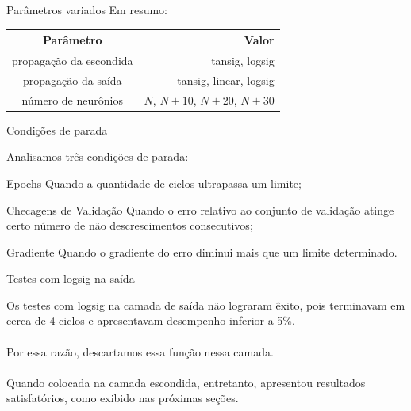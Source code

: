 \begin{frame}{Parâmetros variados}
	Em resumo:
	\begin{table}[H] 
		\centering 
		\begin{tabular}{c|r} 
			Parâmetro & Valor \\ 
			\hline 
			propagação da escondida 	& tansig, logsig\\
			propagação da saída 	        & tansig, linear, logsig\\
			número de neurônios		& $N$, $N+10$, $N+20$, $N+30$\\
		\end{tabular} 
	\end{table}
\end{frame}

\begin{frame}{Condições de parada}
	
Analisamos três condições de parada:

	\begin{block}{Epochs}
        Quando a quantidade de ciclos ultrapassa
                um limite;
	\end{block}

	\begin{block}{Checagens de Validação}
        	Quando o erro relativo ao conjunto
                de validação atinge certo número de não descrescimentos consecutivos;
	\end{block}
	
	\begin{block}{Gradiente}
		Quando o gradiente do erro diminui mais que
                um limite determinado.
	\end{block}

\end{frame}

\begin{frame}{Testes com logsig na saída}
	
	Os testes com logsig na camada de saída não lograram êxito, 
	pois terminavam em cerca de 4 ciclos e apresentavam desempenho
	inferior a 5\%.\\~\\

	Por essa razão, descartamos essa função nessa camada. \\~\\

	Quando colocada na camada escondida, entretanto, apresentou
	resultados satisfatórios, como exibido nas próximas seções.

\end{frame}


